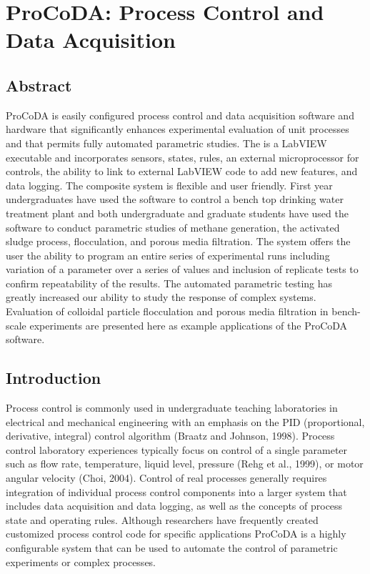 \documentclass[letterpaper,10pt,english]{sphinxmanual}
\begin{document}
\chapter{ProCoDA: Process Control and Data Acquisition}
\label{\detokenize{ProCoDA/ProCoDA:procoda-process-control-and-data-acquisition}}\label{\detokenize{ProCoDA/ProCoDA:title-procoda}}\label{\detokenize{ProCoDA/ProCoDA::doc}}

\section{Abstract}
\label{\detokenize{ProCoDA/ProCoDA:abstract}}
ProCoDA is easily configured process control and data acquisition software and hardware that significantly enhances experimental evaluation of unit processes and that permits fully automated parametric studies. The  is a LabVIEW executable and incorporates sensors, states, rules, an external microprocessor for controls, the ability to link to external LabVIEW code to add new features, and data logging. The composite system is flexible and user friendly. First year undergraduates have used the software to control a bench top drinking water treatment plant and both undergraduate and graduate students have used the software to conduct parametric studies of methane generation, the activated sludge process, flocculation, and porous media filtration. The system offers the user the ability to program an entire series of experimental runs including variation of a parameter over a series of values and inclusion of replicate tests to confirm repeatability of the results. The automated parametric testing has greatly increased our ability to study the response of complex systems. Evaluation of colloidal particle flocculation and porous media filtration in bench-scale experiments are presented here as example applications of the ProCoDA software.


\section{Introduction}
\label{\detokenize{ProCoDA/ProCoDA:introduction}}
Process control is commonly used in undergraduate teaching laboratories in electrical and mechanical engineering with an emphasis on the PID (proportional, derivative, integral) control algorithm (Braatz and Johnson, 1998). Process control laboratory experiences typically focus on control of a single parameter such as flow rate, temperature, liquid level, pressure (Rehg et al., 1999), or motor angular velocity (Choi, 2004). Control of real processes generally requires integration of individual process control components into a larger system that includes data acquisition and data logging, as well as the concepts of process state and operating rules. Although researchers have frequently created customized process control code for specific applications ProCoDA is a highly configurable system that can be used to automate the control of parametric experiments or complex processes.
\end{document}
